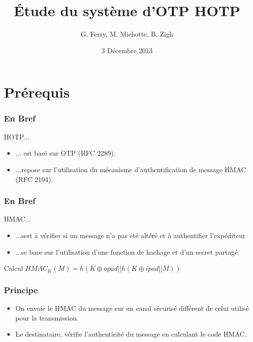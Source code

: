 \documentclass{beamer}
\title{\'Etude du syst\`eme d'OTP \og{}HOTP\fg{}}
\author{G. Ferry, M. Michotte, B. Zigh}
\institute{Universit\'e de Rouen}
\date{3 D\'ecembre 2013}
\begin{document}
\begin{frame} 
\titlepage
\end{frame}

\section{Pr\'erequis}

\begin{frame} 
\frametitle{En Bref}

\begin{block}{HOTP...}
\begin{itemize}
\item ... est bas\'e sur OTP (RFC 2289).
\pause \item ...repose sur l'utilisation du m\'ecanisme d'authentification de message HMAC (RFC 2104).
\end{itemize}  
\end{block}

\end{frame}

\begin{frame} 
\frametitle{En Bref}

\begin{block}{HMAC...}
\begin{itemize}
\item ...sert \`a v\'erifier si un message n'a pas \'et\'e alt\'er\'e
et \`a authentifier l'exp\'editeur
\pause\item ...se base sur l'utilisation d'une fonction de hachage et d'un secret partag\'e.
\end{itemize}  
\end{block}

\pause
\begin{exampleblock}{Calcul}
$HMAC_K(M) = h(K \oplus opad || h(K \oplus ipad || M))$ 
\end{exampleblock}

\end{frame}

\begin{frame}
\frametitle{Principe}
\begin{itemize}
\item On envoie le HMAC du message sur un canal s\'ecuris\'e diff\'erent de celui utilis\'e pour la transmission.
\pause
\item Le destinataire,  v\'erifie l'authenticit\'e du message en calculant le code HMAC.
\end{itemize}


\end{frame}
\end{document}
